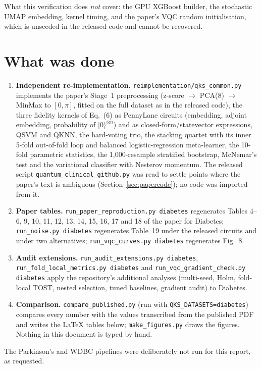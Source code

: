 \documentclass[11pt,a4paper]{article}
\newcommand{\code}[1]{\texttt{\small #1}}
\newcommand{\tabdir}{../reimplementation/tex/}
\begin{document}

What this verification does \emph{not} cover: the GPU XGBoost builder, the stochastic UMAP embedding, kernel timing, and the paper's VQC random initialisation, which is unseeded in the released code and cannot be recovered.



\section{What was done}
\begin{enumerate}[nosep]
  \item \textbf{Independent re-implementation.} \code{reimplementation/qks\_common.py} implements the paper's Stage~1 preprocessing (z-score $\to$ PCA(8) $\to$ MinMax to $[0,\pi]$, fitted on the full dataset as in the released code), the three fidelity kernels of Eq.~(6) as PennyLane circuits (embedding, adjoint embedding, probability of $|0\rangle^{\otimes n}$) and as closed-form/statevector expressions, QSVM and QKNN, the hard-voting trio, the stacking quartet with its inner 5-fold out-of-fold loop and balanced logistic-regression meta-learner, the 10-fold parametric statistics, the 1,000-resample stratified bootstrap, McNemar's test and the variational classifier with Nesterov momentum. The released script \code{quantum\_clinical\_github.py} was read to settle points where the paper's text is ambiguous (Section~\ref{sec:papercode}); no code was imported from it.
  \item \textbf{Paper tables.} \code{run\_paper\_reproduction.py diabetes} regenerates Tables 4--6, 9, 10, 11, 12, 13, 14, 15, 16, 17 and 18 of the paper for Diabetes; \code{run\_noise.py diabetes} regenerates Table~19 under the released circuits and under two alternatives; \code{run\_vqc\_curves.py diabetes} regenerates Fig.~8.
  \item \textbf{Audit extensions.} \code{run\_audit\_extensions.py diabetes}, \code{run\_fold\_local\_metrics.py diabetes} and \code{run\_vqc\_gradient\_check.py diabetes} apply the repository's additional analyses (multi-seed, Holm, fold-local TOST, nested selection, tuned baselines, gradient audit) to Diabetes.
  \item \textbf{Comparison.} \code{compare\_published.py} (run with \code{QKS\_DATASETS=diabetes}) compares every number with the values transcribed from the published PDF and writes the LaTeX tables below; \code{make\_figures.py} draws the figures. Nothing in this document is typed by hand.
\end{enumerate}
The Parkinson's and WDBC pipelines were deliberately not run for this report, as requested.
\end{document}
